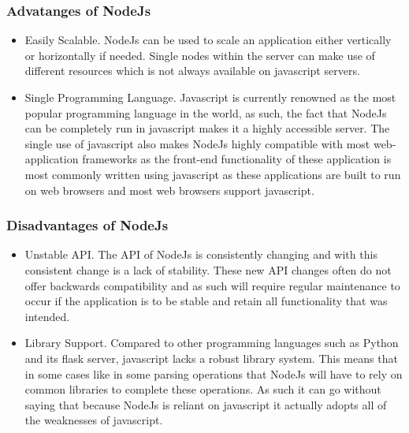 \subsubsection{Advatanges of NodeJs}
\begin{itemize}
    \item Easily Scalable. NodeJs can be used to scale an application either vertically or horizontally if needed. Single nodes within the server can make use of different resources which is not always available on javascript servers.
    \newpage
    \item Single Programming Language. Javascript is currently renowned as the most popular programming language in the world, as such, the fact that NodeJs can be completely run in javascript makes it a highly accessible server. The single use of javascript also makes NodeJs highly compatible with most web-application frameworks as the front-end functionality of these application is most commonly written using javascript as these applications are built to run on web browsers and most web browsers support javascript.
\end{itemize}

\subsubsection{Disadvantages of NodeJs}
\begin{itemize}
    \item Unstable API. The API of NodeJs is consistently changing and with this consistent change is a lack of stability. These new API changes often do not offer backwards compatibility and as such will require regular maintenance to occur if the application is to be stable and retain all functionality that was intended.
    \item Library Support. Compared to other programming languages such as Python and its flask server, javascript lacks a robust library system. This means that in some cases like in some parsing operations that NodeJs will have to rely on common libraries to complete these operations. As such it can go without saying that because NodeJs is reliant on javascript it actually adopts all of the weaknesses of javascript.
\end{itemize}

